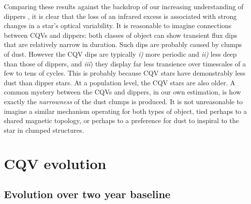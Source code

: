 \documentclass[11pt,twocolumn,tighten]{aastex63}
\begin{document}
Comparing these results against the backdrop of our increasing
understanding of dippers
\citep[e.g.][]{2014AJ....147...82C,2016ApJ...816...69A,2021ApJ...908...16R,2022ApJS..263...14C},
it is clear that the loss of an infrared excess is associated with
strong changes in a star's optical variability.  It is reasonable to
imagine connections between CQVs and dippers: both classes of object
can show transient flux dips that are relatively narrow in duration.
Such dips are probably caused by clumps of dust.  However the CQV dips
are typically {\it i)} more periodic and {\it ii)} less deep than
those of dippers, and {\it iii}) they display far less transience over
timescales of a few to tens of cycles.  This is probably because CQV
stars have demonstrably less dust than dipper stars.  At a population
level, the CQV stars are also older.  A common mystery between the
CQVs and dippers, in our own estimation, is how exactly the {\it
narrowness} of the dust clumps is produced.  It is not unreasonable to
imagine a similar mechanism operating for both types of object, tied
perhaps to a shared magnetic topology, or perhaps to a preference for
dust to inspiral to the star in clumped structures.


\section{CQV evolution}

\subsection{Evolution over two year baseline}
\end{document}
